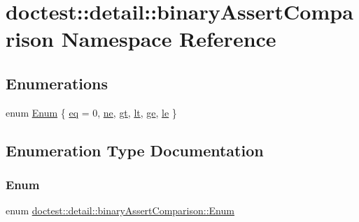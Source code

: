 \hypertarget{namespacedoctest_1_1detail_1_1binary_assert_comparison}{}\section{doctest\+:\+:detail\+:\+:binary\+Assert\+Comparison Namespace Reference}
\label{namespacedoctest_1_1detail_1_1binary_assert_comparison}
\subsection*{Enumerations}
\begin{DoxyCompactItemize}
\item 
enum \hyperlink{namespacedoctest_1_1detail_1_1binary_assert_comparison_a2117cafa5b007d26f2e0988f3a081569}{Enum} \{ \newline
\hyperlink{namespacedoctest_1_1detail_1_1binary_assert_comparison_a2117cafa5b007d26f2e0988f3a081569af644d2e3091c342ab78b12da1fcb06dc}{eq} = 0, 
\hyperlink{namespacedoctest_1_1detail_1_1binary_assert_comparison_a2117cafa5b007d26f2e0988f3a081569a851b5dd9ab390a406621216da112ac9c}{ne}, 
\hyperlink{namespacedoctest_1_1detail_1_1binary_assert_comparison_a2117cafa5b007d26f2e0988f3a081569a3efb665f41cd9490d9739e1ad228918e}{gt}, 
\hyperlink{namespacedoctest_1_1detail_1_1binary_assert_comparison_a2117cafa5b007d26f2e0988f3a081569aea0e8621512e05d78d88ff2d2c164a6b}{lt}, 
\newline
\hyperlink{namespacedoctest_1_1detail_1_1binary_assert_comparison_a2117cafa5b007d26f2e0988f3a081569a1de9460fcfb6a1681f13d54083f88313}{ge}, 
\hyperlink{namespacedoctest_1_1detail_1_1binary_assert_comparison_a2117cafa5b007d26f2e0988f3a081569a58efccb94f787a00914adc6db077347b}{le}
 \}
\end{DoxyCompactItemize}


\subsection{Enumeration Type Documentation}
\mbox{\label{namespacedoctest_1_1detail_1_1binary_assert_comparison_a2117cafa5b007d26f2e0988f3a081569}} 
\subsubsection{\texorpdfstring{Enum}{Enum}}
{\footnotesize\ttfamily enum \hyperlink{namespacedoctest_1_1detail_1_1binary_assert_comparison_a2117cafa5b007d26f2e0988f3a081569}{doctest\+::detail\+::binary\+Assert\+Comparison\+::\+Enum}}

